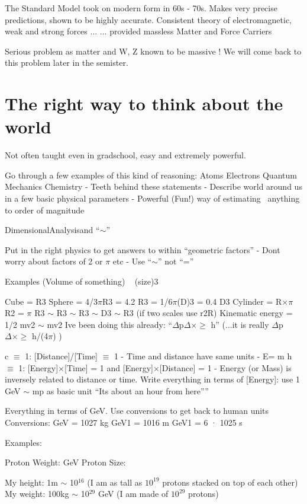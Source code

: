 The Standard Model took on modern form in 60s - 70s.
Makes very precise predictions, shown to be highly accurate.
Consistent theory of electromagnetic, weak and strong forces ...
... provided massless Matter and Force Carriers

Serious problem as matter and W, Z known to be massive !
We will come back to this problem later in the semister.


\clearpage

\section{The right way to think about the world}


Not often taught even in gradschool,  easy and extremely powerful.

Go through a few examples of this kind of reasoning:
Atoms
Electrons
Quantum Mechanics
        Chemistry
      - Teeth behind these statements
- Describe world around us in a few basic physical parameters
- Powerful (Fun!) way of estimating ~anything to order of magnitude


DimensionalAnalysisand ``$\sim$''

Put in the right physics to get answers to within ``geometric factors''
- Dont worry about factors of 2 or $\pi$ etc
- Use ``$\sim$'' not ``=''


Examples (Volume of something) ~ (size)3

Cube = R3
Sphere = 4/3$\pi$R3 = 4.2 R3
= 1/6$\pi$(D)3 = 0.4 D3 Cylinder = R$\times\pi$R2 = $\pi$ R3
$\sim$ R3 $\sim$ R3 $\sim$ D3
$\sim$ R3 (if two scales use r2R) Kinematic energy = 1/2 mv2 $\sim$ mv2
Ive been doing this already: ``$\Delta$p$\Delta\times \geq $ h''
(...it is really $\Delta$p$\Delta\times \geq $ h/(4$\pi$) )

c $\equiv$ 1: [Distance]/[Time] $\equiv$ 1
- Time and distance have same units
- E= m
h $\equiv$ 1: [Energy]$\times$[Time] = 1 and [Energy]$\times$[Distance] = 1
- Energy (or Mass) is inversely related to distance or time.
Write everything in terms of [Energy]: use 1 GeV $\sim$ mp as basic unit
``Its about an hour from here”''

Everything in terms of GeV. Use conversions to get back to human units
Conversions:
GeV = 1027 
kg GeV1 = 1016 m
GeV1 = 6 · 1025 s

Examples:

Proton Weight:  GeV
Proton Size:    \iGeV

My height: 1m $\sim$ 10$^{16}$ \iGeV
(I am as tall as $10^{19}$ protons stacked on top of each other)
My weight: 100kg $\sim$ 10$^{29}$ GeV
(I am made of $10^{29}$ protons)


